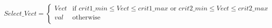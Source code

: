 \[
Select\_Vect =  \begin{cases}
Vect & \text{if } crit1\_min \leq Vect \leq crit1\_max  \text{ or } 
 crit2\_min \leq Vect \leq crit2\_max \\
val & \text{otherwise}\\
\end{cases}
\]
